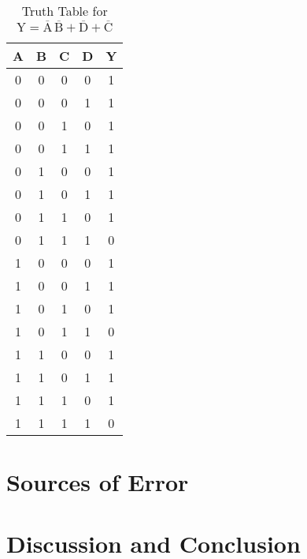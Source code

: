 \documentclass{scrartcl}
\begin{document}
\begin{table}[H]
    \centering
    \caption{Truth Table for \(\mathrm{ Y = \overline{A}\,\overline{B} + \overline{D} + \overline{C} }\)}
    \vspace{0.2cm}
    \begin{tabular}{|c|c|c|c||c|}
    \hline
    \textbf{A} & \textbf{B} & \textbf{C} & \textbf{D} & \textbf{Y} \\
    \hline
    0 & 0 & 0 & 0 & 1 \\
    0 & 0 & 0 & 1 & 1 \\
    0 & 0 & 1 & 0 & 1 \\
    0 & 0 & 1 & 1 & 1 \\
    0 & 1 & 0 & 0 & 1 \\
    0 & 1 & 0 & 1 & 1 \\
    0 & 1 & 1 & 0 & 1 \\
    0 & 1 & 1 & 1 & 0 \\
    1 & 0 & 0 & 0 & 1 \\
    1 & 0 & 0 & 1 & 1 \\
    1 & 0 & 1 & 0 & 1 \\
    1 & 0 & 1 & 1 & 0 \\
    1 & 1 & 0 & 0 & 1 \\
    1 & 1 & 0 & 1 & 1 \\
    1 & 1 & 1 & 0 & 1 \\
    1 & 1 & 1 & 1 & 0 \\
    \hline
    \end{tabular}
    \end{table}
\section{Sources of Error}
\section{Discussion and Conclusion}
\end{document}
